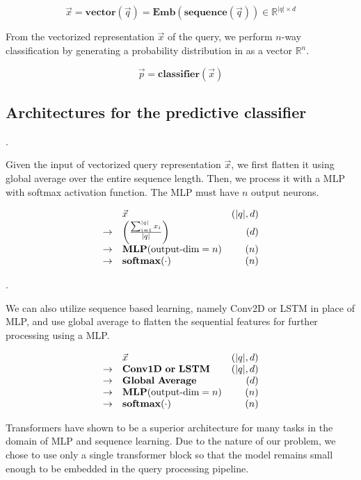\documentclass[conference]{IEEEtran}
\begin{document}
$$
\Vec{x} = \mathbf{vector}(\vec q) = \mathbf{Emb}(\mathbf{sequence}(\vec q))\in\mathbb{R}^{|q|\times d}
$$

From the vectorized representation $\Vec{x}$ of the query,
we perform $n$-way classification by generating a probability
distribution in as a vector $\mathbb{R}^n$.

$$\Vec{p} = \mathbf{classifier}(\Vec x)$$

\subsection{Architectures for the predictive classifier}
\label{sec:architectures}

.

Given the input of vectorized query representation $\vec x$, 
we first flatten it using global average over the entire sequence length.  Then, we process it with a MLP with softmax
activation function.  The MLP must have $n$ output neurons.

$$
\begin{array}{rlr}
&\vec x  & (|q|, d) \\
\to & \left(\frac{\sum_{i=1}^{|q|} x_i}{|q|}\right) & (d) \\
\to & \mathbf{MLP}(\makebox{output-dim}=n) & (n) \\
\to & \mathbf{softmax}(\cdot) & (n) \\
\end{array}
$$

.

We can also utilize sequence based learning, namely Conv2D or LSTM in place
of MLP, and use global average to flatten the sequential features for further processing using a MLP.

$$
\begin{array}{rlr}
&\vec x  & (|q|, d) \\
\to & \mathbf{Conv1D\ or\ LSTM} & (|q|, d) \\
\to & \mathbf{Global\ Average} & (d)\\
\to & \mathbf{MLP}(\makebox{output-dim}=n) & (n) \\
\to & \mathbf{softmax}(\cdot) & (n) \\
\end{array}
$$


Transformers have shown to be a superior architecture for many tasks in the domain of MLP and sequence learning.  Due to the nature of our problem, we chose to use only a single transformer block so that the model remains small enough to be embedded in the query processing pipeline.
\end{document}
